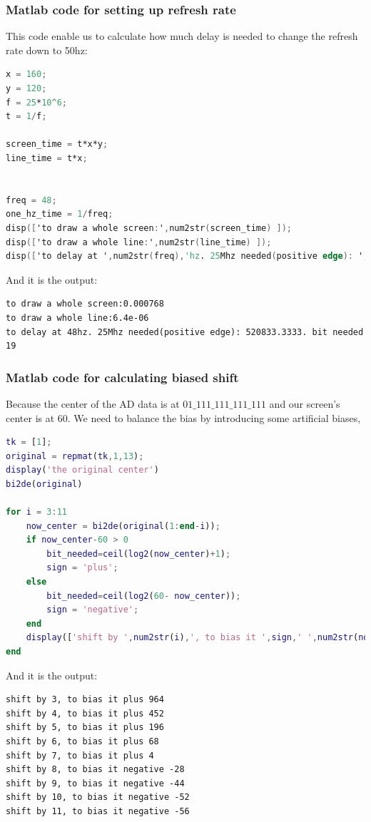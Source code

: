 \documentclass[11pt]{scrartcl}
\begin{document}
\subsubsection{Matlab code for setting up refresh rate}
\label{sec:refresh}
This code enable us to calculate how much delay is needed to change the refresh rate down to 50hz:
\begin{lstlisting}[language=Verilog]
x = 160;
y = 120;
f = 25*10^6;
t = 1/f;

screen_time = t*x*y;
line_time = t*x;


freq = 48;
one_hz_time = 1/freq;
disp(['to draw a whole screen:',num2str(screen_time) ]);
disp(['to draw a whole line:',num2str(line_time) ]);
disp(['to delay at ',num2str(freq),'hz. 25Mhz needed(positive edge): ',num2str(one_hz_time/t),'. bit needed ',num2str(ceil(log2(one_hz_time/t)))]);
\end{lstlisting}

And it is the output:
\begin{verbatim}
to draw a whole screen:0.000768
to draw a whole line:6.4e-06
to delay at 48hz. 25Mhz needed(positive edge): 520833.3333. bit needed 19
\end{verbatim}

\subsubsection{Matlab code for calculating biased shift}

\label{sec:biased}
Because the center of the AD data is at $01\_111\_111\_111\_111$ and our screen's center is at 60. We need to balance the bias by introducing some artificial biases, 
\begin{lstlisting}[language=Matlab]
tk = [1];
original = repmat(tk,1,13);
display('the original center')
bi2de(original)

for i = 3:11
    now_center = bi2de(original(1:end-i));
    if now_center-60 > 0
        bit_needed=ceil(log2(now_center)+1);
        sign = 'plus';
    else
        bit_needed=ceil(log2(60- now_center));
        sign = 'negative';
    end
    display(['shift by ',num2str(i),', to bias it ',sign,' ',num2str(now_center-59)])
end
\end{lstlisting}
And it is the output:
\begin{verbatim}
shift by 3, to bias it plus 964
shift by 4, to bias it plus 452
shift by 5, to bias it plus 196
shift by 6, to bias it plus 68
shift by 7, to bias it plus 4
shift by 8, to bias it negative -28
shift by 9, to bias it negative -44
shift by 10, to bias it negative -52
shift by 11, to bias it negative -56
\end{verbatim}
\end{document}

